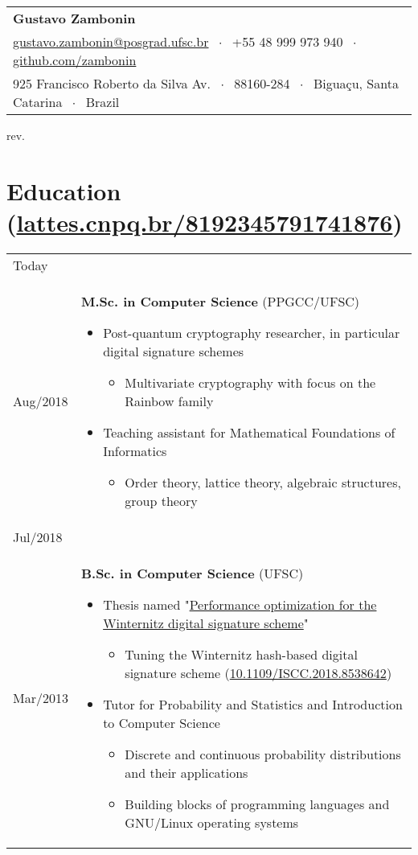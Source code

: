 \documentclass{article}
\newenvironment{contenttable}[1]
  {\section*{#1}
   \newcolumntype{L}{>{\bf \raggedleft}p{0.1\textwidth}}
   \newcolumntype{R}{p{0.82\textwidth}}
   \begin{tabular}{L!{\color{lightgray} \vrule}R}}
  {\end{tabular}}
\newcommand{\csep}{$\;\cdot\;$}
\newcommand{\lattesurl}{lattes.cnpq.br/8192345791741876}
\newcommand{\bscurl}{https://repositorio.ufsc.br/handle/123456789/187875}
\newcommand{\doi}{10.1109/ISCC.2018.8538642}
\begin{document}
\begin{tabular}{@{\hspace{0mm}}l}
  {\Large \textbf{Gustavo Zambonin}} \\
  \href{mailto:gustavo.zambonin@posgrad.ufsc.br}{gustavo.zambonin@posgrad.ufsc.br}
      \csep{} +55 48 999 973 940
      \csep{} \href{https://github.com/zambonin}{github.com/zambonin} \\
  925 Francisco Roberto da Silva Av. \csep{} 88160-284
      \csep{} Biguaçu, Santa Catarina \csep{} Brazil
\end{tabular}
\hfill rev. 

\begin{contenttable}{Education
    {\normalsize\normalfont (\href{http://\lattesurl}{\lattesurl})}}
  Today \\ Aug/2018 & \textbf{M.Sc. in Computer Science} (PPGCC/UFSC)
  \begin{itemize}
    \item Post-quantum cryptography researcher, in particular digital signature
        schemes
    \begin{itemize}
      \item Multivariate cryptography with focus on the Rainbow family
    \end{itemize}
    \item Teaching assistant for Mathematical Foundations of Informatics
    \begin{itemize}
      \item Order theory, lattice theory, algebraic structures, group theory
    \end{itemize}
  \end{itemize} \\

  Jul/2018 \\ Mar/2013 & \textbf{B.Sc. in Computer Science} (UFSC)
  \begin{itemize}
    \item Thesis named "\href{\bscurl}{Performance optimization for the
        Winternitz digital signature scheme}"
    \begin{itemize}
      \item Tuning the Winternitz hash-based digital signature scheme
          (\href{https://doi.org/\doi}{\doi})
    \end{itemize}
    \item Tutor for Probability and Statistics and Introduction to Computer
        Science
    \begin{itemize}
      \item Discrete and continuous probability distributions and their
          applications
      \item Building blocks of programming languages and GNU/Linux operating
          systems
    \end{itemize}
    \vspace{-5mm}
  \end{itemize}
\end{contenttable}
\end{document}

